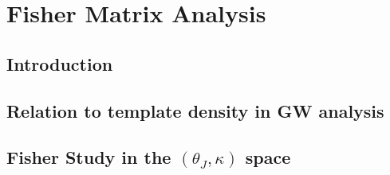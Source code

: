 
\chapter{Fisher Matrix Analysis}
\section{Introduction}
\section{Relation to template density in GW analysis}
\section{Fisher Study in the $(\theta_J, \kappa)$ space}

